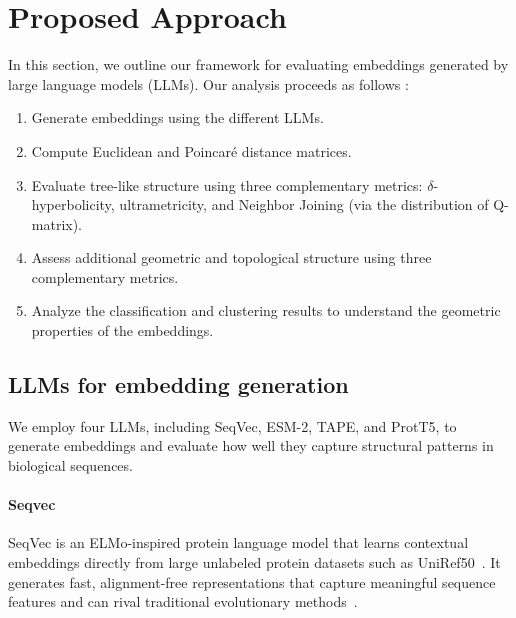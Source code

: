 \documentclass[]{Liebert_Author_revised}
\begin{document}
\section{Proposed Approach}
\label{sec_PAa}

In this section, we outline our framework for evaluating embeddings generated by large language models (LLMs). Our analysis proceeds as follows :
\begin{enumerate}
    \item Generate embeddings using the different LLMs.
    \item Compute Euclidean and Poincaré distance matrices.
    \item Evaluate tree-like structure using three complementary metrics: $\delta$-hyperbolicity, ultrametricity, and Neighbor Joining (via the distribution of Q-matrix).
    \item Assess additional geometric and topological structure using three complementary metrics.
    \item Analyze the classification and clustering results to understand the geometric properties of the embeddings.
\end{enumerate}

\subsection{LLMs for embedding generation}
We employ four LLMs, including SeqVec, ESM-2, TAPE, and ProtT5, to generate embeddings and evaluate how well they capture structural patterns in biological sequences.
\paragraph{Seqvec~\citeauthor{heinzinger2019modeling}}
SeqVec is an ELMo-inspired protein language model that learns contextual embeddings directly from large unlabeled protein datasets such as UniRef50~\citeauthor{suzek2015uniref}. It generates fast, alignment-free representations that capture meaningful sequence features and can rival traditional evolutionary methods~\citeauthor{sarzynska2021detecting}.
\end{document}
